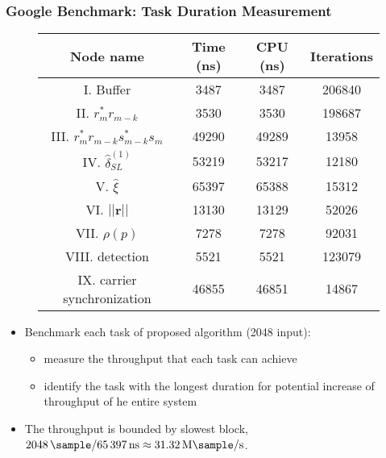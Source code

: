   \begin{frame}
    \frametitle{Google Benchmark: Task Duration Measurement}

    \begin{figure}
        \centering
        \begin{table}[t]
          \tiny
          \centering %
          \begin{tabular}{c c c c} %
          \hline\hline %
          Node name & Time (ns) & CPU (ns) & Iterations \\ [0.5ex] %
          \hline %
          I. Buffer  & 3487 & 3487 & 206840 \\ %
          II. $r_m^*r_{m-k}$  & 3530 & 3530 & 198687 \\
          III. $r_m^*r_{m-k}s_{m-k}^*s_m$ & 49290 & 49289 & 13958 \\
          IV. $\hat{\delta}_{SL}^{(1)}$ & 53219 & 53217 & 12180 \\
          V. $\hat{\xi}$ & 65397 & 65388 & 15312 \\
          VI. $||\bm{r}||$ & 13130 & 13129 & 52026 \\ %
          VII. $\rho(p)$ & 7278 & 7278 & 92031 \\
          VIII. detection & 5521 & 5521 & 123079 \\
          IX. carrier synchronization & 46855 & 46851 & 14867  \\ [1ex]
          \hline
          \end{tabular}
          \label{table:BM_function_nodes} %
        \end{table}   
    \end{figure}

    \begin{itemize}
       \item Benchmark each task of proposed algorithm
         (\qty{2048}{\sample} input):
       \begin{itemize}
        \item measure the throughput that each task can achieve
        \item identify the task with the longest duration for
          potential increase of throughput of he entire system
       \end{itemize}
       \item The throughput is bounded by slowest block, $\SI{2048}{\sample}/\SI{65397}{\nano\second}  \approx \SI[per-mode=symbol]{31.32}{\mega\sample\per\second}$.
    \end{itemize}
  \end{frame}

